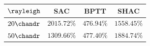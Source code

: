 \begin{tabular}{lccc}
\toprule
$\rayleigh$ & SAC & BPTT & SHAC \\
\midrule
$20\chandr$ & $2015.72\%$ & $\mathbf{476.94}\%$ & $1558.45\%$ \\
$50\chandr$ & $1309.66\%$ & $\mathbf{477.40}\%$ & $1884.74\%$ \\
\bottomrule
\end{tabular}

